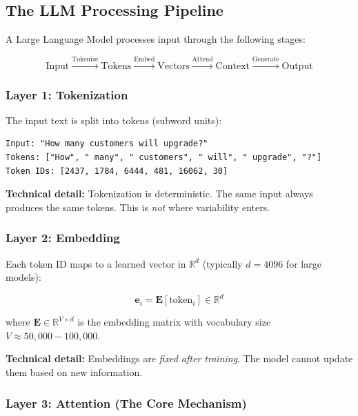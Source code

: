 \subsection{The LLM Processing Pipeline}

A Large Language Model processes input through the following stages:

\begin{equation}
\text{Input} \xrightarrow{\text{Tokenize}} \text{Tokens} \xrightarrow{\text{Embed}} \text{Vectors} \xrightarrow{\text{Attend}} \text{Context} \xrightarrow{\text{Generate}} \text{Output}
\end{equation}

\subsubsection{Layer 1: Tokenization}

The input text is split into tokens (subword units):

\begin{verbatim}
Input: "How many customers will upgrade?"
Tokens: ["How", " many", " customers", " will", " upgrade", "?"]
Token IDs: [2437, 1784, 6444, 481, 16062, 30]
\end{verbatim}

\textbf{Technical detail:} Tokenization is deterministic. The same input always produces the same tokens. This is \textit{not} where variability enters.

\subsubsection{Layer 2: Embedding}

Each token ID maps to a learned vector in $\mathbb{R}^d$ (typically $d = 4096$ for large models):

\begin{equation}
\mathbf{e}_i = \mathbf{E}[\text{token}_i] \in \mathbb{R}^d
\end{equation}

where $\mathbf{E} \in \mathbb{R}^{V \times d}$ is the embedding matrix with vocabulary size $V \approx 50,000-100,000$.

\textbf{Technical detail:} Embeddings are \textit{fixed after training}. The model cannot update them based on new information.

\subsubsection{Layer 3: Attention (The Core Mechanism)}

